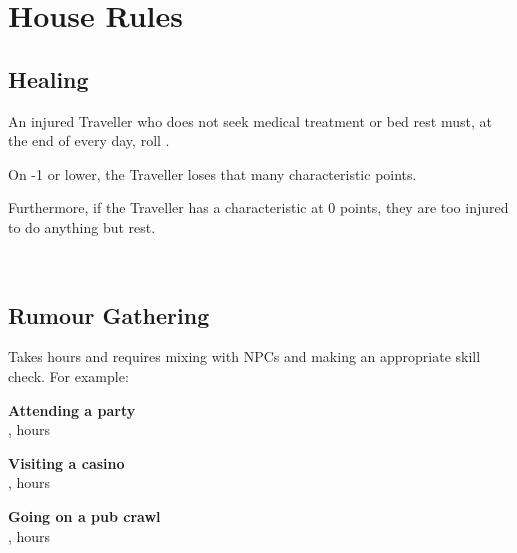 \documentclass{cheatsheet}
\begin{document}
\section{House Rules}

\begin{multicols*}{2}
\subsection{Healing}
An injured Traveller who does not seek medical treatment or bed rest
must, at the end of every day, roll .

On -1 or lower, the Traveller loses that many characteristic points.

Furthermore, if the Traveller has a characteristic at 0 points, they
are too injured to do anything but rest.

\vfill\,\columnbreak

\subsection{Rumour Gathering}
Takes  hours and requires mixing with NPCs and making an
appropriate skill check.  For example:

\textbf{Attending a party}\\
,  hours

\textbf{Visiting a casino}\\
,  hours

\textbf{Going on a pub crawl}\\
,  hours

\vfill\,\columnbreak
\end{multicols*}
\end{document}

